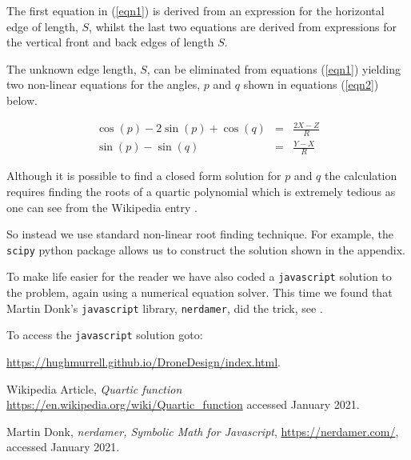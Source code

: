 \documentclass[11pt]{article}
\begin{document}
The first equation in (\ref{eqn1}) is derived from an expression for the horizontal edge of length, $S$,
whilst the last two equations are derived from expressions for the vertical front and back edges of length $S$.

The unknown edge length, $S$, can be eliminated from equations (\ref{eqn1}) yielding two non-linear
equations for the angles, $p$ and $q$ shown in equations (\ref{eqn2}) below.

\begin{eqnarray}
\cos(p) - 2 \sin(p) + \cos(q) & = & \frac{2X-Z}{R} \nonumber \\
\sin(p) - \sin(q) & = & \frac{Y-X}{R}   \label{eqn2} 
\end{eqnarray}

Although it is possible to find a closed form solution for $p$ and $q$ the calculation 
requires finding the roots of a quartic polynomial which is extremely tedious as one
can see from the Wikipedia entry \cite{quartic}.

So instead we use standard non-linear root finding technique. For example,
the {\tt scipy} python package allows us to construct the solution shown in the appendix.

To make life easier for the reader we have also coded a {\tt javascript} solution to the
problem, again using a numerical equation solver. This time we found that Martin Donk's 
{\tt javascript} library, {\tt nerdamer}, did the trick, see  \cite{donk} . 

To access the {\tt javascript} solution goto:

\url{https://hughmurrell.github.io/DroneDesign/index.html}.


\newpage
\begin{thebibliography}{99}


 Wikipedia Article,
{\em Quartic function} 
\url{https://en.wikipedia.org/wiki/Quartic_function}
accessed January 2021.

 Martin Donk,
{\em nerdamer, Symbolic Math for Javascript},
\url{https://nerdamer.com/},
accessed January 2021.

\end{thebibliography}
\end{document}
